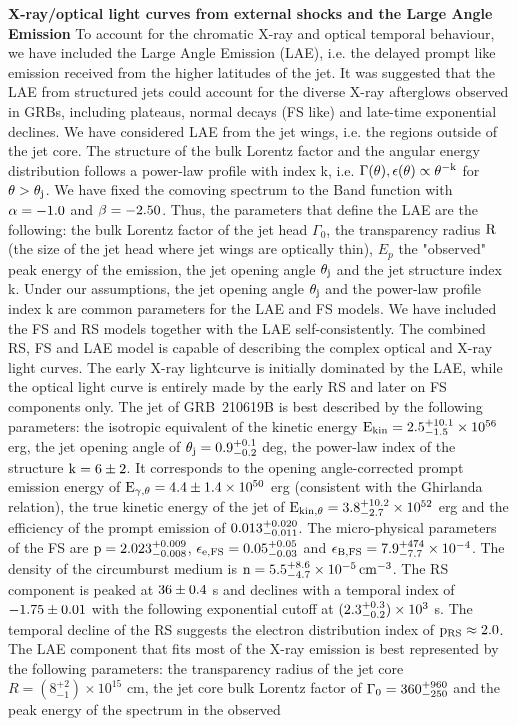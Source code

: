 \documentclass{naturesubmissionstyle}
\begin{document}
{\noindent \bf X-ray/optical light curves from external shocks and the Large Angle Emission}
To account for the chromatic X-ray and optical temporal behaviour, we have included the Large Angle Emission (LAE)\cite{Fenimore1996,Kumar2000}, i.e. the delayed prompt like emission received from the higher latitudes of the jet. It was suggested that the LAE from structured jets could account for the diverse X-ray afterglows observed in GRBs, including plateaus, normal decays (FS like) and late-time exponential declines\cite{Oganesyan2020,Panaitescu2020}. We have considered LAE from the jet wings, i.e. the regions outside of the jet core. The structure of the bulk Lorentz factor and the angular energy distribution follows a power-law profile with index k, i.e. $\rm \Gamma (\theta), \epsilon (\theta) \propto \theta^{-k}$ for $\rm \theta>\theta_{j}$. We have fixed the comoving spectrum to the Band function with $\rm \alpha=-1.0$ and $\rm \beta=-2.50$. Thus, the parameters that define the LAE are the following: the bulk Lorentz factor of the jet head $\Gamma_{0}$, the transparency radius $\rm R$ (the size of the jet head where jet wings are optically thin\cite{Ascenzi2020}), $E_{p}$ the "observed" peak energy of the emission, the jet opening angle $\rm \theta_{j}$ and the jet structure index k. Under our assumptions, the jet opening angle $\rm \theta_{j}$ and the power-law profile index k are common parameters for the LAE and FS models. We have included the FS and RS models together with the LAE self-consistently. The combined RS, FS and LAE model is capable of describing the complex optical and X-ray light curves. The early X-ray lightcurve is initially dominated by the LAE, while the optical light curve is entirely made by the early RS and later on FS components only. The jet of GRB~210619B is best described by the following parameters: the isotropic equivalent of the kinetic energy $\rm E_{kin} = 2.5_{-1.5}^{+10.1} \times 10^{56}$ erg, the jet opening angle of $\rm \theta_{j}=0.9_{-0.2}^{+0.1}$ deg, the power-law index of the structure $\rm k=6 \pm 2$. It corresponds to the opening angle-corrected prompt emission energy of $\rm E_{\gamma,\theta}=4.4 \pm 1.4 \times 10^{50}$ erg (consistent with the Ghirlanda relation\cite{Ghirlanda2004}), the true kinetic energy of the jet of $\rm E_{kin,\theta} = 3.8_{-2.7}^{+10.2} \times 10^{52}$ erg and the efficiency of the prompt emission of $\rm 0.013_{-0.011}^{+0.020}$. The micro-physical parameters of the FS are $\rm p=2.023_{-0.008}^{+0.009}$, $\rm \epsilon_{e,FS}=0.05_{-0.03}^{+0.05}$ and $\rm \epsilon_{B,FS}=7.9_{-7.7}^{+474} \times 10^{-4}$. The density of the circumburst medium is $\rm n = 5.5_{-4.7}^{+8.6} \times 10^{-5} \, cm^{-3}$. The RS component is peaked at $\rm 36\pm0.4$ s and declines with a temporal index of $\rm -1.75\pm0.01$ with the following exponential cutoff at $(\rm 2.3_{-0.2}^{+0.3}) \times 10^{3}$ s. The temporal decline of the RS\cite{Kobayashi2000} suggests the electron distribution index of $\rm p_{RS} \approx 2.0$. The LAE component that fits most of the X-ray emission is best represented by the following parameters: the transparency radius of the jet core $R=(8_{-1}^{+2} )\times 10^{15}$ cm, the jet core bulk Lorentz factor of $\rm \Gamma_{0}=360_{-250}^{+960}$ and the peak energy of the spectrum in the observed 
\end{document}
